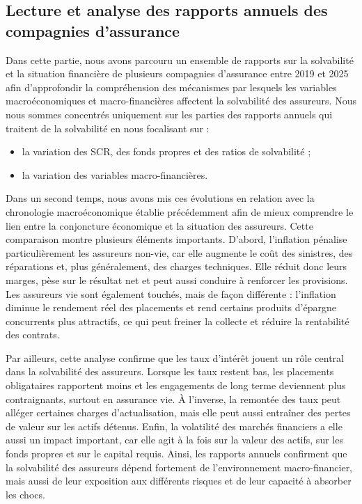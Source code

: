 \documentclass[
]{article}
\providecommand{\tightlist}{%
  \setlength{\itemsep}{0pt}\setlength{\parskip}{0pt}}
\begin{document}
\subsection{Lecture et analyse des rapports annuels des compagnies
d'assurance}\label{lecture-et-analyse-des-rapports-annuels-des-compagnies-dassurance}

Dans cette partie, nous avons parcouru un ensemble de rapports sur la
solvabilité et la situation financière de plusieurs compagnies
d'assurance entre 2019 et 2025 afin d'approfondir la compréhension des
mécanismes par lesquels les variables macroéconomiques et
macro-financières affectent la solvabilité des assureurs. Nous nous
sommes concentrés uniquement sur les parties des rapports annuels qui
traitent de la solvabilité en nous focalisant sur :

\begin{itemize}
\tightlist
\item
  la variation des SCR, des fonds propres et des ratios de solvabilité ;
\item
  la variation des variables macro-financières.
\end{itemize}

Dans un second temps, nous avons mis ces évolutions en relation avec la
chronologie macroéconomique établie précédemment afin de mieux
comprendre le lien entre la conjoncture économique et la situation des
assureurs. Cette comparaison montre plusieurs éléments importants.
D'abord, l'inflation pénalise particulièrement les assureurs non-vie,
car elle augmente le coût des sinistres, des réparations et, plus
généralement, des charges techniques. Elle réduit donc leurs marges,
pèse sur le résultat net et peut aussi conduire à renforcer les
provisions. Les assureurs vie sont également touchés, mais de façon
différente : l'inflation diminue le rendement réel des placements et
rend certains produits d'épargne concurrents plus attractifs, ce qui
peut freiner la collecte et réduire la rentabilité des contrats.

Par ailleurs, cette analyse confirme que les taux d'intérêt jouent un
rôle central dans la solvabilité des assureurs. Lorsque les taux restent
bas, les placements obligataires rapportent moins et les engagements de
long terme deviennent plus contraignants, surtout en assurance vie. À
l'inverse, la remontée des taux peut alléger certaines charges
d'actualisation, mais elle peut aussi entraîner des pertes de valeur sur
les actifs détenus. Enfin, la volatilité des marchés financiers a elle
aussi un impact important, car elle agit à la fois sur la valeur des
actifs, sur les fonds propres et sur le capital requis. Ainsi, les
rapports annuels confirment que la solvabilité des assureurs dépend
fortement de l'environnement macro-financier, mais aussi de leur
exposition aux différents risques et de leur capacité à absorber les
chocs.
\end{document}
